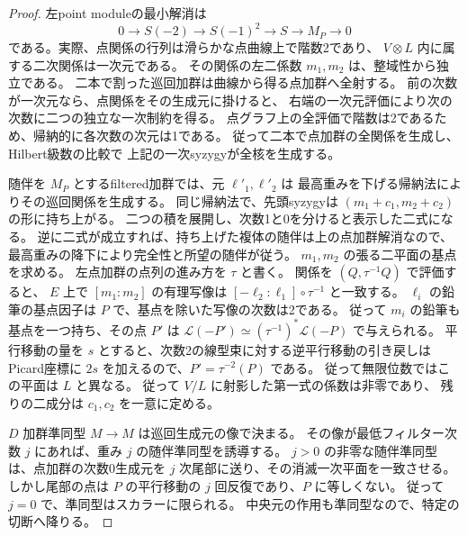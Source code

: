 \begin{proof}
左point moduleの最小解消は
\[
 0\longrightarrow S(-2)\longrightarrow S(-1)^2
 \longrightarrow S\longrightarrow M_P\longrightarrow0
\]
である。実際、点関係の行列は滑らかな点曲線上で階数2であり、
$V\otimes L$ 内に属する二次関係は一次元である。
その関係の左二係数 $m_1,m_2$ は、整域性から独立である。
二本で割った巡回加群は曲線から得る点加群へ全射する。
前の次数が一次元なら、点関係をその生成元に掛けると、
右端の一次元評価により次の次数に二つの独立な一次制約を得る。
点グラフ上の全評価で階数は2であるため、帰納的に各次数の次元は1である。
従って二本で点加群の全関係を生成し、Hilbert級数の比較で
上記の一次syzygyが全核を生成する。

随伴を $M_P$ とするfiltered加群では、元 $\ell'_1,\ell'_2$ は
最高重みを下げる帰納法によりその巡回関係を生成する。
同じ帰納法で、先頭syzygyは $(m_1+c_1,m_2+c_2)$ の形に持ち上がる。
二つの積を展開し、次数1と0を分けると表示した二式になる。
逆に二式が成立すれば、持ち上げた複体の随伴は上の点加群解消なので、
最高重みの降下により完全性と所望の随伴が従う。
$m_1,m_2$ の張る二平面の基点を求める。
左点加群の点列の進み方を $\tau$ と書く。
関係を $(Q,\tau^{-1}Q)$ で評価すると、
$E$ 上で $[m_1:m_2]$ の有理写像は
$[-\ell_2:\ell_1]\circ\tau^{-1}$ と一致する。
$\ell_i$ の鉛筆の基点因子は $P$ で、基点を除いた写像の次数は2である。
従って $m_i$ の鉛筆も基点を一つ持ち、その点 $P'$ は
$\mathcal L(-P')\simeq(\tau^{-1})^*\mathcal L(-P)$ で与えられる。
平行移動の量を $s$ とすると、次数2の線型束に対する逆平行移動の引き戻しは
Picard座標に $2s$ を加えるので、$P'=\tau^{-2}(P)$ である。
従って無限位数ではこの平面は $L$ と異なる。
従って $V/L$ に射影した第一式の係数は非零であり、
残りの二成分は $c_1,c_2$ を一意に定める。

$D$ 加群準同型 $M\to M$ は巡回生成元の像で決まる。
その像が最低フィルター次数 $j$ にあれば、重み $j$ の随伴準同型を誘導する。
$j>0$ の非零な随伴準同型は、点加群の次数0生成元を
$j$ 次尾部に送り、その消滅一次平面を一致させる。
しかし尾部の点は $P$ の平行移動の $j$ 回反復であり、$P$ に等しくない。
従って $j=0$ で、準同型はスカラーに限られる。
中央元の作用も準同型なので、特定の切断へ降りる。
\end{proof}


